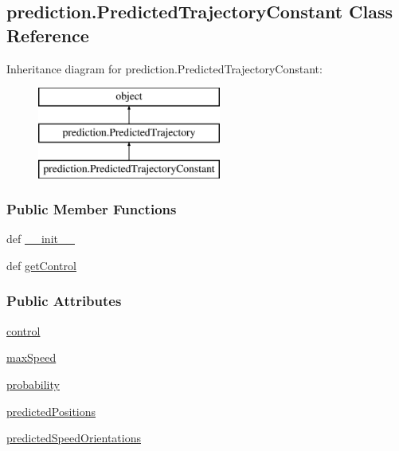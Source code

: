 \hypertarget{classprediction_1_1PredictedTrajectoryConstant}{\subsection{prediction.\-Predicted\-Trajectory\-Constant Class Reference}
\label{classprediction_1_1PredictedTrajectoryConstant}
}
Inheritance diagram for prediction.\-Predicted\-Trajectory\-Constant\-:\begin{figure}[H]
\begin{center}
\leavevmode
\includegraphics[height=3.000000cm]{classprediction_1_1PredictedTrajectoryConstant}
\end{center}
\end{figure}
\subsubsection*{Public Member Functions}
\begin{DoxyCompactItemize}
\item 
def \hyperlink{classprediction_1_1PredictedTrajectoryConstant_a722af0eeee7ea7ba8ecc7dce3dfd3612}{\-\_\-\-\_\-init\-\_\-\-\_\-}
\item 
def \hyperlink{classprediction_1_1PredictedTrajectoryConstant_a18acc110f76a332175721ac26c22485b}{get\-Control}
\end{DoxyCompactItemize}
\subsubsection*{Public Attributes}
\begin{DoxyCompactItemize}
\item 
\hyperlink{classprediction_1_1PredictedTrajectoryConstant_ae68f6314a9b1d1732cba734f5bf229a8}{control}
\item 
\hyperlink{classprediction_1_1PredictedTrajectoryConstant_a6b7055bfede1d9002344f749ba6e767d}{max\-Speed}
\item 
\hyperlink{classprediction_1_1PredictedTrajectoryConstant_a25a782bac3d4c5b57c76552c9b0fb34b}{probability}
\item 
\hyperlink{classprediction_1_1PredictedTrajectoryConstant_a539185ae508bef4837dff3b9c14932bf}{predicted\-Positions}
\item 
\hyperlink{classprediction_1_1PredictedTrajectoryConstant_af8a3f06e9bc93b447461dc952726b517}{predicted\-Speed\-Orientations}
\end{DoxyCompactItemize}


